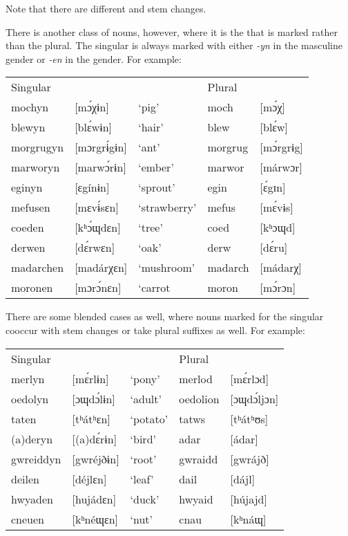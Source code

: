 \documentclass[output=paper,
modfonts
]{LSP/langsci}
\begin{document}
\noindent Note that there are different  and stem changes.

There is another class of nouns, however, where it is the  that is marked rather than the plural. The singular is always marked with either \emph{-yn} in the masculine gender or \emph{-en} in the  gender. For example:

\ea
\begin{tabular}[t]{lllll}
Singular  &             &              & Plural \\
mochyn    & [mɔ́χɨn]     & `pig'        & moch    & [mɔ́χ] \\
blewyn    & [blɛ́wɨn]    & `hair'       & blew    & [blɛ́w] \\
morgrugyn & [mɔrgrɨ́gɨn] & `ant'        & morgrug & [mɔ́rgrɨg] \\
marworyn  & [marwɔ́rɨn]  & `ember'      & marwor  & [márwɔr] \\
eginyn    & [ɛgínɨn]    & `sprout'     & egin    & [ɛ́gɪn] \\
mefusen   & [mɛvɨ́sɛn]   & `strawberry' & mefus   & [mɛ́vɨs] \\
coeden    & [kʰɔ́ɰdɛn]   & `tree'       & coed    & [kʰɔɰd] \\
derwen    & [dɛ́rwɛn]    & `oak'        & derw    & [dɛ́ru] \\
madarchen & [madárχɛn]  & `mushroom'   & madarch & [mádarχ] \\
moronen   & [mɔrɔ́nɛn]   & `carrot      & moron   & [mɔ́rɔn] \\
\end{tabular}
\z

There are some blended cases as well, where nouns marked for the singular cooccur with stem changes or take plural suffixes as well. For example:

\ea
\begin{tabular}[t]{lllll}
Singular  &            &          & Plural \\
merlyn    & [mɛ́rlɨn]   & `pony'   & merlod   & [mɛ́rlɔd] \\
oedolyn   & [ɔɰdɔ́lɨn]  & `adult'  & oedolion & [ɔɰdɔ́ljɔn] \\
taten     & [tʰátʰɛn]  & `potato' & tatws    & [tʰátʰʊs] \\
(a)deryn  & [(a)dɛ́rɨn] & `bird'   & adar     & [ádar] \\
gwreiddyn & [gwréjðɨn] & `root'   & gwraidd  & [gwrájð] \\
deilen    & [déjlɛn]   & `leaf'   & dail     & [dájl] \\
hwyaden   & [hujádɛn]  & `duck'   & hwyaid   & [hújajd] \\
cneuen    & [kʰnéɰɛn]  & `nut'    & cnau     & [kʰnáɰ]
\end{tabular}
\z
\end{document}
